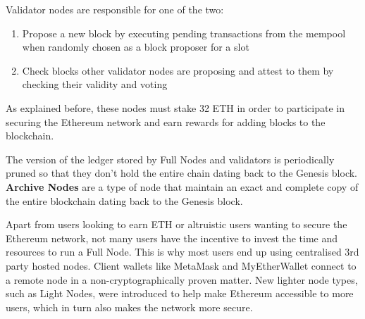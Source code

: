 Validator nodes are responsible for one of the two:
\begin{enumerate}
    \item Propose a new block by executing pending transactions from the mempool when randomly chosen as a block proposer for a slot
    \item Check blocks other validator nodes are proposing and attest to them by checking their validity and voting 
\end{enumerate}
As explained before, these nodes must stake 32 ETH in order to participate in securing the Ethereum network and earn rewards for adding blocks to the blockchain.

The version of the ledger stored by Full Nodes and validators is periodically pruned so that they don't hold the entire chain dating back to the Genesis block. \textbf{Archive Nodes} are a type of node that maintain an exact and complete copy of the entire blockchain dating back to the Genesis block. 

Apart from users looking to earn ETH or altruistic users wanting to secure the Ethereum network, not many users have the incentive to invest the time and resources to run a Full Node. This is why most users end up using centralised 3rd party hosted nodes. Client wallets like MetaMask and MyEtherWallet connect to a remote node in a non-cryptographically proven matter. New lighter node types, such as Light Nodes, were introduced to help make Ethereum accessible to more users, which in turn also makes the network more secure.





